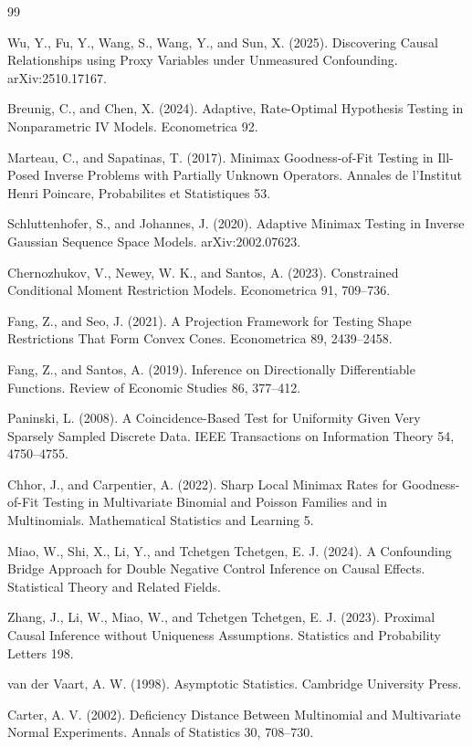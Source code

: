 \documentclass{article}
\begin{document}
\begin{thebibliography}{99}

   Wu, Y., Fu, Y., Wang, S., Wang, Y., and Sun, X. (2025). Discovering Causal Relationships using Proxy Variables under Unmeasured Confounding. arXiv:2510.17167.

   Breunig, C., and Chen, X. (2024). Adaptive, Rate-Optimal Hypothesis Testing in Nonparametric IV Models. Econometrica 92.

   Marteau, C., and Sapatinas, T. (2017). Minimax Goodness-of-Fit Testing in Ill-Posed Inverse Problems with Partially Unknown Operators. Annales de l'Institut Henri Poincare, Probabilites et Statistiques 53.

   Schluttenhofer, S., and Johannes, J. (2020). Adaptive Minimax Testing in Inverse Gaussian Sequence Space Models. arXiv:2002.07623.

   Chernozhukov, V., Newey, W. K., and Santos, A. (2023). Constrained Conditional Moment Restriction Models. Econometrica 91, 709--736.

   Fang, Z., and Seo, J. (2021). A Projection Framework for Testing Shape Restrictions That Form Convex Cones. Econometrica 89, 2439--2458.

   Fang, Z., and Santos, A. (2019). Inference on Directionally Differentiable Functions. Review of Economic Studies 86, 377--412.

   Paninski, L. (2008). A Coincidence-Based Test for Uniformity Given Very Sparsely Sampled Discrete Data. IEEE Transactions on Information Theory 54, 4750--4755.

   Chhor, J., and Carpentier, A. (2022). Sharp Local Minimax Rates for Goodness-of-Fit Testing in Multivariate Binomial and Poisson Families and in Multinomials. Mathematical Statistics and Learning 5.

   Miao, W., Shi, X., Li, Y., and Tchetgen Tchetgen, E. J. (2024). A Confounding Bridge Approach for Double Negative Control Inference on Causal Effects. Statistical Theory and Related Fields.

   Zhang, J., Li, W., Miao, W., and Tchetgen Tchetgen, E. J. (2023). Proximal Causal Inference without Uniqueness Assumptions. Statistics and Probability Letters 198.

   van der Vaart, A. W. (1998). Asymptotic Statistics. Cambridge University Press.

   Carter, A. V. (2002). Deficiency Distance Between Multinomial and Multivariate Normal Experiments. Annals of Statistics 30, 708--730.

\end{thebibliography}
\end{document}
